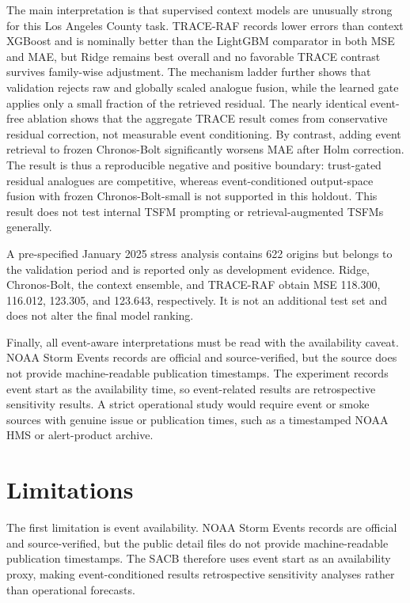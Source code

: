 \documentclass{ieeeaccess}
\begin{document}
The main interpretation is that supervised context models are unusually strong
for this Los Angeles County task. TRACE-RAF records lower errors than context XGBoost and is
nominally better than the LightGBM comparator in both MSE and MAE, but Ridge remains
best overall and no favorable TRACE contrast survives family-wise adjustment.
The mechanism ladder further shows that validation rejects raw and globally
scaled analogue fusion, while the learned gate applies only a small fraction of
the retrieved residual. The nearly identical event-free ablation shows that the
aggregate TRACE result comes from conservative residual correction, not
measurable event conditioning. By contrast, adding event retrieval to frozen Chronos-Bolt
significantly worsens MAE after Holm correction. The result is thus a
reproducible negative and positive boundary: trust-gated residual analogues are
competitive, whereas event-conditioned output-space fusion with frozen
Chronos-Bolt-small is not supported in this holdout. This result does not test
internal TSFM prompting or retrieval-augmented TSFMs generally.

A pre-specified January 2025 stress analysis contains 622 origins but belongs to
the validation period and is reported only as development evidence. Ridge,
Chronos-Bolt, the context ensemble, and TRACE-RAF obtain MSE 118.300, 116.012,
123.305, and 123.643, respectively. It is not an additional test set and does
not alter the final model ranking.

Finally, all event-aware interpretations must be read with the availability
caveat. NOAA Storm Events records are official and source-verified, but the source
does not provide machine-readable publication timestamps. The experiment records
event start as the availability time, so event-related results are retrospective
sensitivity results. A strict operational study would require event or smoke
sources with genuine issue or publication times, such as a timestamped NOAA HMS
or alert-product archive.
\section{Limitations}

The first limitation is event availability. NOAA Storm Events records are
official and source-verified, but the public detail files do not provide
machine-readable publication timestamps. The SACB therefore uses event start as
an availability proxy, making event-conditioned results retrospective
sensitivity analyses rather than operational forecasts.
\end{document}
